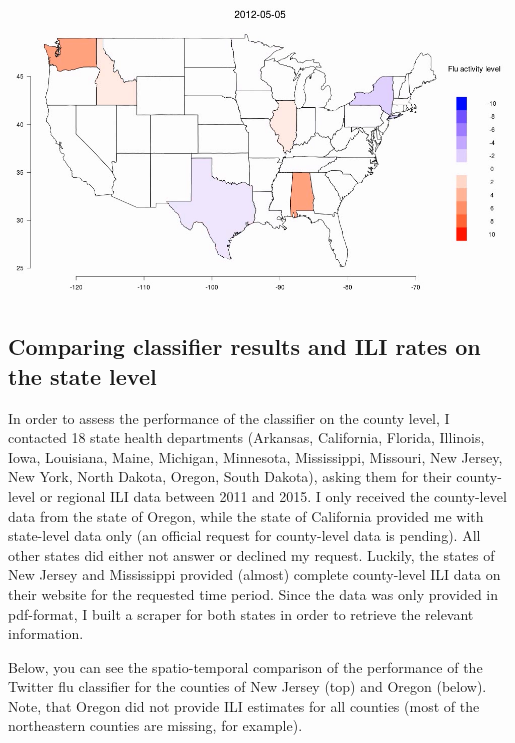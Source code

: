 \documentclass[11pt, a4paper,twoside]{report}\usepackage[]{graphicx}\usepackage[]{color}
\begin{document}
\bigskip

\begin{center} \href{run:vids/state_Twitter_cdc_diff_full_rel_sick_user.avi}{\includegraphics[scale=0.5]{vids/ScreenshotState.png}} 
\end{center}

\subsection{Comparing classifier results and ILI rates on the state level}
\label{sec:comp_cdc_county}
In order to assess the performance of the classifier on the county level, I contacted 18 state health departments (Arkansas, California, Florida, Illinois, Iowa, Louisiana, Maine, Michigan, Minnesota, Mississippi, Missouri, New Jersey, New York, North Dakota, Oregon, South Dakota), asking them for their county-level or regional ILI data between 2011 and 2015. I only received the county-level data from the state of Oregon, while the state of California provided me with state-level data only (an official request for county-level data is pending). All other states did either not answer or declined my request. Luckily, the states of New Jersey and Mississippi provided (almost) complete county-level ILI data on their website for the requested time period. Since the data was only provided in pdf-format, I built a scraper for both states in order to retrieve the relevant information. 

Below, you can see the spatio-temporal comparison of the performance of the Twitter flu classifier for the counties of New Jersey (top) and Oregon (below). Note, that Oregon did not provide ILI estimates for all counties (most of the northeastern counties are missing, for example).
\end{document}
